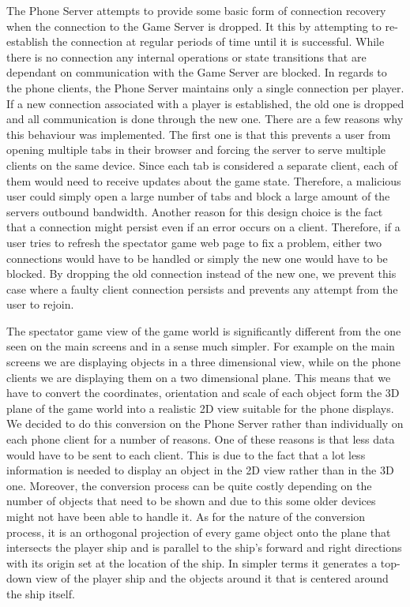 \documentclass[a4paper,11pt]{article}
\begin{document}
The Phone Server attempts to provide some basic form of connection recovery when the connection to the Game Server is dropped. It this by attempting to re-establish the connection at regular periods of time until it is successful. While there is no connection any internal operations or state transitions that are dependant on communication with the Game Server are blocked. In regards to the phone clients, the Phone Server maintains only a single connection per player. If a new connection associated with a player is established, the old one is dropped and all communication is done through the new one. There are a few reasons why this behaviour was implemented. The first one is that this prevents a user from opening multiple tabs in their browser and forcing the server to serve multiple clients on the same device. Since each tab is considered a separate client, each of them would need to receive updates about the game state. Therefore, a malicious user could simply open a large number of tabs and block a large amount of the servers outbound bandwidth. Another reason for this design choice is the fact that a connection might persist even if an error occurs on a client. Therefore, if a user tries to refresh the spectator game web page to fix a problem, either two connections would have to be handled or simply the new one would have to be blocked. By dropping the old connection instead of the new one, we prevent this case where a faulty client connection persists and prevents any attempt from the user to rejoin.

The spectator game view of the game world is significantly different from the one seen on the main screens and in a sense much simpler. For example on the main screens we are displaying objects in a three dimensional view, while on the phone clients we are displaying them on a two dimensional plane. This means that we have to convert the coordinates, orientation and scale of each object form the 3D plane of the game world into a realistic 2D view suitable for the phone displays. We decided to do this conversion on the Phone Server rather than individually on each phone client for a number of reasons. One of these reasons is that less data would have to be sent to each client. This is due to the fact that a lot less information is needed to display an object in the 2D view rather than in the 3D one. Moreover, the conversion process can be quite costly depending on the number of objects that need to be shown and due to this some older devices might not have been able to handle it. As for the nature of the conversion process, it is an orthogonal projection of every game object onto the plane that intersects the player ship and is parallel to the ship's forward and right directions with its origin set at the location of the ship. In simpler terms it generates a top-down view of the player ship and the objects around it that is centered around the ship itself.
\end{document}
